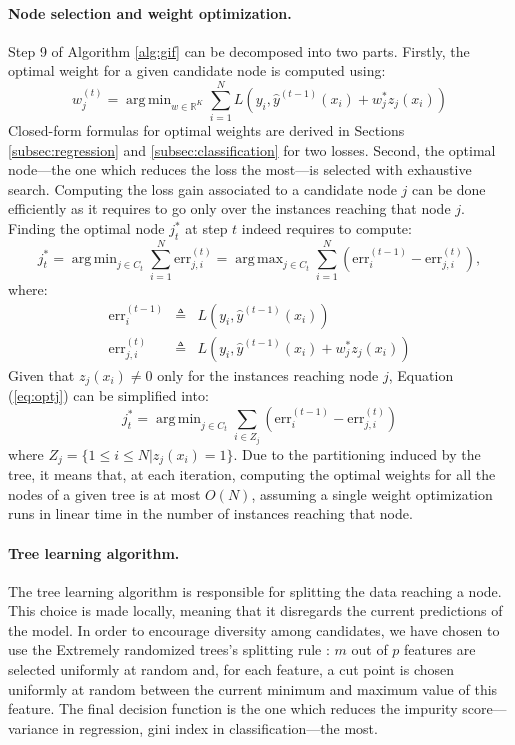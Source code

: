 \documentclass{article}
\DeclareMathOperator*{\argmin}{arg\,min}
\DeclareMathOperator*{\argmax}{arg\,max}
\begin{document}
\paragraph{Node selection and weight optimization.}
Step 9 of Algorithm \ref{alg:gif} can be decomposed into two parts. Firstly,
the optimal weight for a given candidate node is computed using:
\begin{equation}\label{eq:nodeSel}
  w^{(t)}_j = \argmin_{w\in \mathbb{R}^K} \sum_{i=1}^N L\left(y_i, 
  \hat{y}^{(t-1)}(x_i) + w_j^* z_j(x_i)  \right)
\end{equation}
Closed-form formulas for optimal weights are derived in Sections
\ref{subsec:regression} and \ref{subsec:classification} for two losses. Second,
the optimal node---the one which reduces the loss the most---is selected with
exhaustive search. Computing the loss gain associated to a candidate node $j$
can be done efficiently as it requires to go only over the instances reaching
that node $j$. Finding the optimal node $j_t^*$ at step $t$ indeed requires to 
compute:
\begin{equation}\label{eq:optj}
  j_t^* = \argmin_{j \in C_t} \sum_{i=1}^N \text{err}_{j,i}^{(t)} = \argmax_{j 
  \in C_t} 
  \sum_{i=1}^N (\text{err}^{(t-1)}_i - \text{err}_{j,i}^{(t)}),
\end{equation}
where:
\begin{eqnarray*}%
\text{err}^{(t-1)}_i & \triangleq &  L \left(y_i, 
\hat{y}^{(t-1)}(x_i)  \right) \\
\text{err}_{j,i}^{(t)} & \triangleq&  L \left(y_i, 
\hat{y}^{(t-1)}(x_i) + w_j^* z_j(x_i)  \right)
\end{eqnarray*}
Given that $z_j(x_i)\neq 0$ only for the instances reaching node $j$, Equation 
(\ref{eq:optj}) can be simplified into:
\begin{equation}\label{eq:optj2}
  j_t^* = \argmin_{j \in C_t} \sum_{i\in Z_j} (\text{err}^{(t-1)}_i - 
  \text{err}_{j,i}^{(t)})
\end{equation}
where $Z_j = \{1 \leq i \leq N | z_j (x_i)=1 \}$. Due to the partitioning
induced by the tree, it means that, at each iteration, computing the optimal
weights for all the nodes of a given tree is at most $O(N)$, assuming a single
weight optimization runs in linear time in the number of instances reaching
that node.

\paragraph{Tree learning algorithm.}
The tree learning algorithm is responsible for splitting the data reaching a 
node. This choice is made locally, meaning that it disregards the current 
predictions of the model. In order to encourage diversity among candidates, we 
have chosen to use the Extremely randomized trees's splitting rule 
\cite{extratrees}: $m$ out of $p$ features are selected uniformly at random 
and, for each feature, a cut point is chosen uniformly at random between the 
current minimum and maximum value of this feature. The final decision function 
is the one which reduces the impurity score---variance in regression, gini 
index in classification---the most.
\end{document}
